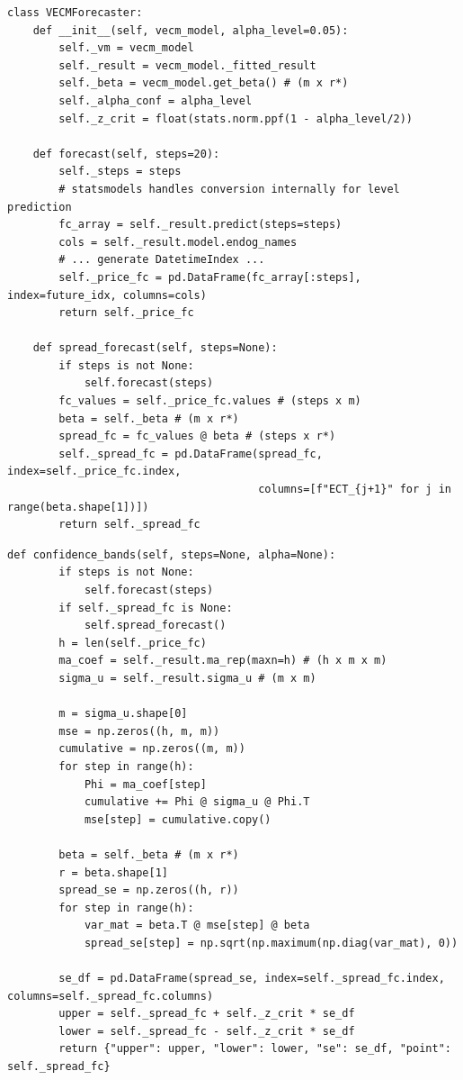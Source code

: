 \documentclass[10pt,a4paper,twocolumn]{article}
\begin{document}
\begin{tcolorbox}[codebox={\texttt{vecm\_forecast.py} Main Methods}]
\begin{lstlisting}[style=pythonplain]
class VECMForecaster:
    def __init__(self, vecm_model, alpha_level=0.05):
        self._vm = vecm_model
        self._result = vecm_model._fitted_result
        self._beta = vecm_model.get_beta() # (m x r*)
        self._alpha_conf = alpha_level
        self._z_crit = float(stats.norm.ppf(1 - alpha_level/2))
        
    def forecast(self, steps=20):
        self._steps = steps
        # statsmodels handles conversion internally for level prediction
        fc_array = self._result.predict(steps=steps)
        cols = self._result.model.endog_names
        # ... generate DatetimeIndex ...
        self._price_fc = pd.DataFrame(fc_array[:steps], index=future_idx, columns=cols)
        return self._price_fc

    def spread_forecast(self, steps=None):
        if steps is not None:
            self.forecast(steps)
        fc_values = self._price_fc.values # (steps x m)
        beta = self._beta # (m x r*)
        spread_fc = fc_values @ beta # (steps x r*)
        self._spread_fc = pd.DataFrame(spread_fc, index=self._price_fc.index,
                                       columns=[f"ECT_{j+1}" for j in range(beta.shape[1])])
        return self._spread_fc
\end{lstlisting}
\tcblower
\begin{lstlisting}[style=pythonplain]
    def confidence_bands(self, steps=None, alpha=None):
        if steps is not None:
            self.forecast(steps)
        if self._spread_fc is None:
            self.spread_forecast()
        h = len(self._price_fc)
        ma_coef = self._result.ma_rep(maxn=h) # (h x m x m)
        sigma_u = self._result.sigma_u # (m x m)
        
        m = sigma_u.shape[0]
        mse = np.zeros((h, m, m))
        cumulative = np.zeros((m, m))
        for step in range(h):
            Phi = ma_coef[step]
            cumulative += Phi @ sigma_u @ Phi.T
            mse[step] = cumulative.copy()
            
        beta = self._beta # (m x r*)
        r = beta.shape[1]
        spread_se = np.zeros((h, r))
        for step in range(h):
            var_mat = beta.T @ mse[step] @ beta
            spread_se[step] = np.sqrt(np.maximum(np.diag(var_mat), 0))
            
        se_df = pd.DataFrame(spread_se, index=self._spread_fc.index, columns=self._spread_fc.columns)
        upper = self._spread_fc + self._z_crit * se_df
        lower = self._spread_fc - self._z_crit * se_df
        return {"upper": upper, "lower": lower, "se": se_df, "point": self._spread_fc}
\end{lstlisting}
\end{tcolorbox}
\end{document}
